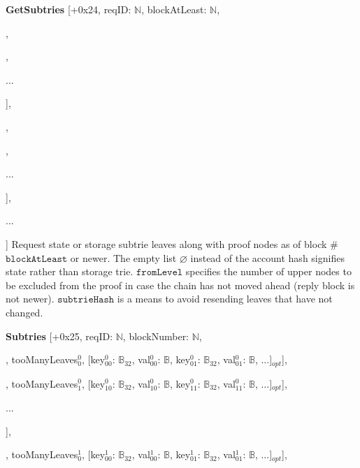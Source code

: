 \documentclass{amsart}
\begin{document}
\textbf{GetSubtries} [+0x24, reqID: $\mathbb{N}$, blockAtLeast: $\mathbb{N}$,

\quad [account$^0$: $\mathbb{B}_{32} | \varnothing$,

\qquad [prefix$^0_0$: $\mathbb{Y}$, fromLevel$^0_0$: $\mathbb{N}$, subtrieHash$^0_0$: $\mathbb{B}_{32}| \varnothing$],

,

\qquad ...

\quad ],

\quad [account$^1$: $\mathbb{B}_{32} | \varnothing$,

\qquad [prefix$^1_0$: $\mathbb{Y}$, fromLevel$^1_0$: $\mathbb{N}$, subtrieHash$^1_0$: $\mathbb{B}_{32}| \varnothing$],

,

\qquad ...

\quad ],

\quad ...

] Request state or storage subtrie leaves along with proof nodes as of block \#$\texttt{blockAtLeast}$ or newer.
The empty list $\varnothing$ instead of the account hash signifies state rather than storage trie.
$\texttt{fromLevel}$ specifies the number of upper nodes to be excluded from the proof in case the chain has not moved ahead (reply block is not newer).
$\texttt{subtrieHash}$ is a means to avoid resending leaves that have not changed.

\textbf{Subtries} [+0x25, reqID: $\mathbb{N}$,  blockNumber: $\mathbb{N}$,

\quad [

\qquad [[node$^0_{00}$: $\mathbb{B}$, node$^0_{01}$: $\mathbb{B}$, ...], tooManyLeaves$^0_0$, [key$^0_{00}$: $\mathbb{B}_{32}$, val$^0_{00}$: $\mathbb{B}$, key$^0_{01}$: $\mathbb{B}_{32}$, val$^0_{01}$: $\mathbb{B}$, ...]$_{opt}$],

\qquad [[node$^0_{10}$: $\mathbb{B}$, node$^0_{11}$: $\mathbb{B}$, ...], tooManyLeaves$^0_1$, [key$^0_{10}$: $\mathbb{B}_{32}$, val$^0_{10}$: $\mathbb{B}$, key$^0_{11}$: $\mathbb{B}_{32}$, val$^0_{11}$: $\mathbb{B}$, ...]$_{opt}$],

\qquad ...

\quad ],

\quad [

\qquad [[node$^1_{00}$: $\mathbb{B}$, node$^1_{01}$: $\mathbb{B}$, ...], tooManyLeaves$^1_0$, [key$^1_{00}$: $\mathbb{B}_{32}$, val$^1_{00}$: $\mathbb{B}$, key$^1_{01}$: $\mathbb{B}_{32}$, val$^1_{01}$: $\mathbb{B}$, ...]$_{opt}$],
\end{document}
